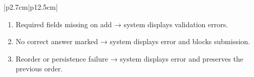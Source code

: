 \begin{table}[H]
\begin{tabular}{|p{2.7cm}|p{12.5cm}|}
\begin{minipage}[t]{\linewidth}
\begin{enumerate}[topsep=0pt,itemsep=1pt,parsep=0pt,partopsep=0pt]
                \item Required fields missing on add → system displays validation errors.
                \item No correct answer marked → system displays error and blocks submission.
                \item Reorder or persistence failure → system displays error and preserves the previous order.
            \end{enumerate}
        \end{minipage} \\
        \hline
    \end{tabular}
    \label{tab:teacher-manage-questions}
\end{table}
 

